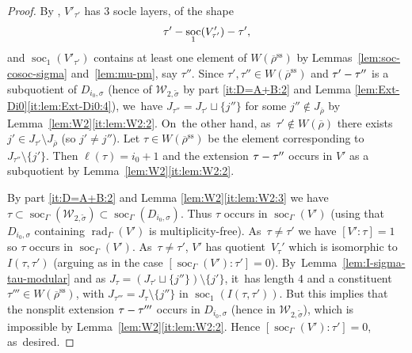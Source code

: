 \documentclass[JEP,XML,SOM,Unicode,NoFloatCountersInSection, NoEqCountersInSection,published]{cedram}
\let\wt\widetilde
\renewcommand{\ss}{\mathrm{ss}}
\newcommand{\brho}{\overline{\rho}}
\DeclareMathOperator{\rad}{rad}
\DeclareMathOperator{\soc}{soc}
\theoremstyle{plain}
\theoremstyle{definition}
\begin{document}
\begin{proof}
By \cite[Cor.\,2.32]{HuWang2}, $V'_{\tau'}$ has $3$ socle layers, of the shape
\[
\tau' \-- \soc_1(V'_{\tau'}) \-- \tau',
\]
and $\soc_1(V'_{\tau'})$ contains at least one element of $W(\brho^\ss)$ by Lemmas~\ref{lem:soc-cosoc-sigma} and~\ref{lem:mu-pm}, say $\tau''$.
Since $\tau',\tau''\in W(\brho^\ss)$ and $\tau'\--\tau''$ is a subquotient of $D_{i_0,\sigma}$ (hence of $\mathcal{W}_{2,\wt\sigma}$ by part \eqref{it:D=A+B:2} and Lemma \ref{lem:Ext-Di0}\eqref{it:lem:Ext-Di0:4}), we~have $J_{\tau''}=J_{\tau'}\sqcup\{j''\}$ for some $j''\notin J_{\brho}$ by Lemma~\ref{lem:W2}\eqref{it:lem:W2:2}. On~the other hand, as~$\tau'\notin W(\brho)$ there exists $j'\in J_{\tau'}\setminus J_{\brho}$ (so $j' \ne j''$).
Let $\tau\in W(\brho^\ss)$ be the element corresponding to $J_{\tau''}\setminus\{j'\}$.
Then $\ell(\tau)=i_0+1$ and the extension $\tau\-- \tau''$ occurs in $V'$ as a subquotient by Lemma~\ref{lem:W2}\eqref{it:lem:W2:2}.

By part \eqref{it:D=A+B:2} and Lemma \ref{lem:W2}\eqref{it:lem:W2:3} we have $\tau\subset \soc_{\Gamma}(\mathcal{W}_{2,\wt{\sigma}}) \subset \soc_{\Gamma}(D_{i_0,\sigma})$.
Thus $\tau$ occurs in $\soc_{\Gamma}(V')$ (using that $D_{i_0,\sigma}$ containing $\rad_{\Gamma}(V')$ is multiplicity-free). As~\hbox{$\tau \ne \tau'$} we have $[V':\tau] = 1$ so $\tau$ occurs in $\soc_{\Gamma}(V')$. As~$\tau \ne \tau'$, $V'$ has quotient~$V_{\tau}'$ which is isomorphic to $I(\tau,\tau')$ (arguing as in the case $[\soc_{\Gamma}(V'):\tau'] = 0$). By~Lemma~\ref{lem:I-sigma-tau-modular} and as $J_{\tau} = (J_{\tau'} \sqcup \{j''\})\setminus \{j'\}$, it~has length $4$ and a constituent $\tau''' \in W(\brho^\ss)$, with $J_{\tau'''}=J_{\tau}\setminus \{j''\}$ in $\soc_1(I(\tau,\tau'))$.
But this implies that the nonsplit extension $\tau\-- \tau'''$ occurs in $D_{i_0,\sigma}$ (hence in $\mathcal{W}_{2,\wt\sigma}$), which is impossible by Lemma~\ref{lem:W2}\eqref{it:lem:W2:2}.
Hence $[\soc_{\Gamma}(V'):\tau'] = 0$, as~desired.
\end{proof}
\end{document}
